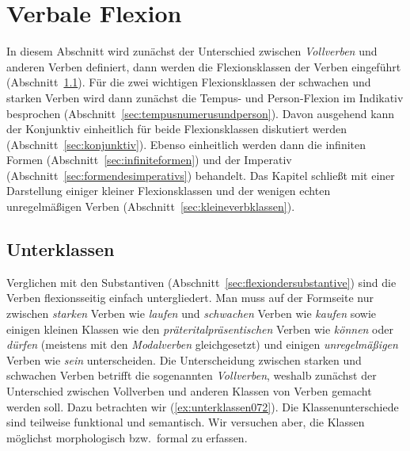 \section{Verbale Flexion}
\label{sec:verbaleflexion}

In diesem Abschnitt wird zunächst der Unterschied zwischen \textit{Vollverben} und anderen Verben definiert, dann werden die Flexionsklassen der Verben eingeführt (Abschnitt~\ref{sec:unterklassen}).
Für die zwei wichtigen Flexionsklassen der schwachen und starken Verben wird dann zunächst die Tempus- und Person-Flexion im Indikativ besprochen (Abschnitt~\ref{sec:tempusnumerusundperson}).
Davon ausgehend kann der Konjunktiv einheitlich für beide Flexionsklassen diskutiert werden (Abschnitt~\ref{sec:konjunktiv}).
Ebenso einheitlich werden dann die infiniten Formen (Abschnitt~\ref{sec:infiniteformen}) und der Imperativ (Abschnitt~\ref{sec:formendesimperativs}) behandelt.
Das Kapitel schließt mit einer Darstellung einiger kleiner Flexionsklassen und der wenigen echten unregelmäßigen Verben (Abschnitt~\ref{sec:kleineverbklassen}).

\subsection{Unterklassen}
\label{sec:unterklassen}


Verglichen mit den Substantiven (Abschnitt~\ref{sec:flexiondersubstantive}) sind die Verben flexionsseitig einfach untergliedert.
Man muss auf der Formseite nur zwischen \textit{starken} Verben wie \textit{laufen} und \textit{schwachen} Verben wie \textit{kaufen} sowie einigen kleinen Klassen wie den \textit{präteritalpräsentischen} Verben wie \textit{können} oder \textit{dürfen} (meistens mit den \textit{Modalverben} gleichgesetzt) und einigen \textit{unregelmäßigen} Verben wie \textit{sein} unterscheiden.
Die Unterscheidung zwischen starken und schwachen Verben betrifft die sogenannten \textit{Vollverben}, weshalb zunächst der Unterschied zwischen Vollverben und anderen Klassen von Verben gemacht werden soll.
Dazu betrachten wir (\ref{ex:unterklassen072}).
Die Klassenunterschiede sind teilweise funktional und semantisch.
Wir versuchen aber, die Klassen möglichst morphologisch bzw.\ formal zu erfassen.

\begin{exe}
  \ex\label{ex:unterklassen072}
  \begin{xlist}
  \end{xlist}
\end{exe}

